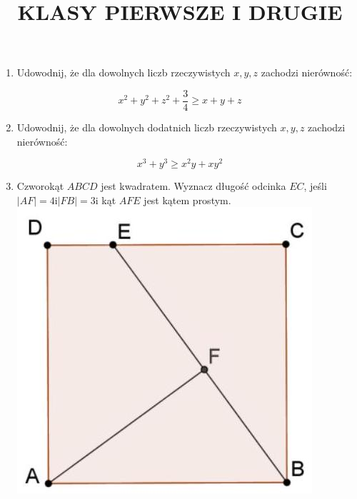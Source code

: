 \documentclass[10pt]{article}
\title{KLASY PIERWSZE I DRUGIE }
\author{}
\date{}
\begin{document}
\maketitle
\begin{enumerate}
  \item Udowodnij, że dla dowolnych liczb rzeczywistych \(x, y, z\) zachodzi nierówność:
\end{enumerate}

\[
x^{2}+y^{2}+z^{2}+\frac{3}{4} \geq x+y+z
\]

\begin{enumerate}
  \setcounter{enumi}{1}
  \item Udowodnij, że dla dowolnych dodatnich liczb rzeczywistych \(x, y, z\) zachodzi nierówność:
\end{enumerate}

\[
x^{3}+y^{3} \geq x^{2} y+x y^{2}
\]

\begin{enumerate}
  \setcounter{enumi}{2}
  \item Czworokąt \(A B C D\) jest kwadratem. Wyznacz długość odcinka \(E C\), jeśli \(|A F|=4 \mathrm{i}|F B|=3 \mathrm{i}\) kąt \(A F E\) jest kątem prostym.\\
\includegraphics[max width=\textwidth, center]{2024_11_21_59b0c2c0bc9b0a979429g-1}
\end{enumerate}
\end{document}
